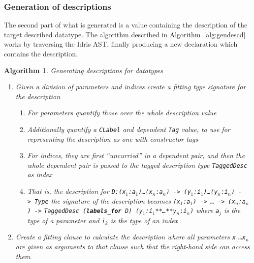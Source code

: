 \documentclass{ituthesis}
\newcommand{\tttype}[1]{\textcolor{type-color}{\texttt{#1}}}
\newcommand{\ttdec}[1]{\textcolor{declared-var-color}{\texttt{#1}}}
\newcommand{\ttvar}[1]{\textcolor{local-var-color}{\texttt{#1}}}
\theoremstyle{break}
\newtheorem{alg}{Algorithm}
\begin{document}
\subsubsection{Generation of descriptions}
\label{ssub:Generation of descriptions}
The second part of what is generated is a value containing the description of the target described datatype.
The algorithm described in Algorithm~\ref{alg:gendescd} works by traversing the Idris AST, finally producing a new declaration which contains the description.

\begin{alg}
  Generating descriptions for datatypes
  \begin{enumerate}
    \item Given a division of parameters and indices create a fitting type signature for the description
       \begin{enumerate}
         \item For parameters quantify those over the whole description value
         \item Additionally quantify a \ttdec{CLabel} and dependent \tttype{Tag} value, to use for representing the description as one with constructor tags
         \item For indices, they are first ``uncurried'' in a dependent pair, and then the whole dependent pair is passed to the tagged description type \tttype{TaggedDesc} as index
         \item[] That is, the description for \tttype{D}\texttt{:}\texttt{(}\ttvar{x$_1$}\texttt{:}\ttvar{a$_1$}\texttt{)}\texttt{\ldots}\texttt{(}\ttvar{x$_n$}\texttt{:}\ttvar{a$_n$}\texttt{)}\texttt{~->~}\texttt{(}\ttvar{y$_1$}\texttt{:}\ttvar{i$_1$}\texttt{)}\texttt{\ldots}\texttt{(}\ttvar{y$_n$}\texttt{:}\ttvar{i$_n$}\texttt{)}\texttt{~->~}\tttype{Type} 
           the signature of the description becomes \texttt{(}\ttvar{x$_1$}\texttt{:}\tttype{a$_1$}\texttt{)}\texttt{~->~}\texttt{\ldots}\texttt{~->~}\texttt{(}\ttvar{x$_n$}\texttt{:}\tttype{a$_n$}\texttt{)}\texttt{~->} \ttdec{TaggedDesc}~\texttt{(\textbf{labels_for}}~\tttype{D}\texttt{)}~\tttype{(}\ttvar{y$_1$}\texttt{:}\ttvar{i$_1$}\tttype{**}\texttt{\ldots}\tttype{**}\ttvar{y$_n$}\texttt{:}\ttvar{i$_n$}\tttype{)} where \ttvar{a$_j$} is the type of a parameter and \ttvar{i$_k$} is the type of an index
       \end{enumerate}
     \item Create a fitting clause to calculate the description where all parameters \ttvar{x$_1$}\texttt{\ldots}\ttvar{x$_n$} are given as arguments to that clause such that the right-hand side can access them

\end{enumerate}
\end{alg}
\end{document}
